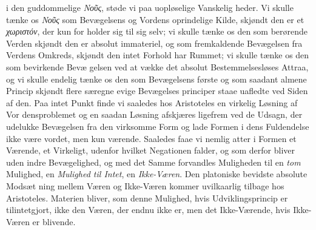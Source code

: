 \documentclass[12pt,a4paper]{book}
\newcommand{\gk}[1]{\textit{#1}}
\begin{document}
i den guddommelige \gk{Νοῦς}, støde vi paa uopløselige Vanskelig\-%
heder. Vi skulle tænke os \gk{Νοῦς} som Bevægelsens og Vordens
oprindelige Kilde, skjøndt den er et \gk{χωριστόν}, der kun for\-%
holder sig til sig selv; vi skulle tænke os den som berørende
Verden skjøndt den er absolut immateriel, og som fremkaldende
Bevægelsen fra Verdens Omkreds, skjøndt den intet Forhold
har Rummet; vi skulle tænke os den som bevirkende Bevæ\-%
gelsen ved at vække det absolut Bestemmelsesløses Attraa, og
vi skulle endelig tænke os den som Bevægelsens første og som
saadant almene Princip skjøndt flere særegne evige Bevægelses\-%
principer staae uafledte ved Siden af den. Paa intet Punkt
finde vi saaledes hos Aristoteles en virkelig Løsning af Vor\-%
densproblemet og en saadan Løsning afskjæres ligefrem ved de
Udsagn, der udelukke Bevægelsen fra den virksomme Form og
lade Formen i dens Fuldendelse ikke være vordet, men kun
værende. Saaledes faae vi nemlig atter i Formen et Værende,
et Virkeligt, udenfor hvilket Negationen falder, og som derfor
bliver uden indre Bevægelighed, og med det Samme forvandles
Muligheden til en \emph{tom} Mulighed, en \emph{Mulighed til Intet},
en \emph{Ikke-Væren}. Den platoniske bevidste absolute Modsæt\-%
ning mellem Væren og Ikke-Væren kommer uvilkaarlig tilbage
hos Aristoteles. Materien bliver, som denne Mulighed, hvis
Udviklingsprincip er tilintetgjort, ikke den Væren, der endnu
ikke er, men det Ikke-Værende, hvis Ikke-Væren er blivende.
\end{document}
